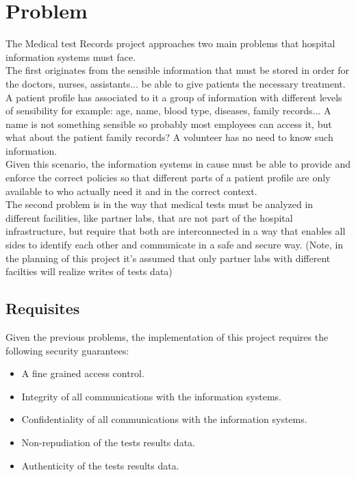 \section{Problem}

The Medical test Records project approaches two main problems that hospital information systems must face. \\

The first originates from the sensible information that must be stored in order for the doctors, nurses, assistants... be able to give patients the necessary treatment. A patient profile has associated to it a group of information with different levels of sensibility for example: age, name, blood type, diseases, family records... 
A name is not something sensible so probably most employees can access it, but what about the patient family records? A volunteer has no need to know such information. \\

Given this scenario, the information systems in cause must be able to provide and enforce the correct policies so that different parts of a patient profile are only available to who actually need it and in the correct context. \\

The second problem is in the way that medical tests must be analyzed in different facilities, like partner labs, that are not part of the hospital infrastructure, but require that both are interconnected in a way that enables all sides to identify each other and communicate in a safe and secure way. (Note, in the planning of this project it's assumed that only partner labs with different facilties will realize writes of tests data)\\

\subsection{Requisites}

Given the previous problems, the implementation of this project requires the following security guarantees:
\begin{itemize}
	\item A fine grained access control.
	\item Integrity of all communications with the information systems.
	\item Confidentiality of all communications with the information systems.
	\item Non-repudiation of the tests results data.
	\item Authenticity of the tests results data.
\end{itemize}

